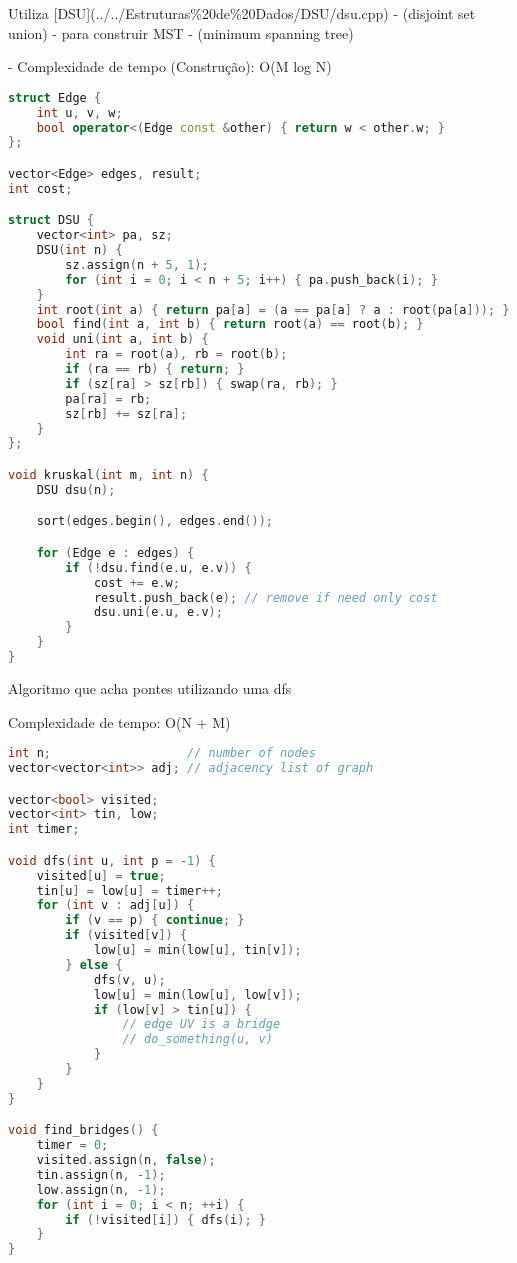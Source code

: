 \documentclass[11pt, a4paper, twoside]{article}
\begin{document}
Utiliza [DSU](../../Estruturas\%20de\%20Dados/DSU/dsu.cpp) - (disjoint set union) - para construir MST - (minimum spanning tree)

- Complexidade de tempo (Construção): O(M log N)

\begin{lstlisting}[language=C++]
struct Edge {
    int u, v, w;
    bool operator<(Edge const &other) { return w < other.w; }
};

vector<Edge> edges, result;
int cost;

struct DSU {
    vector<int> pa, sz;
    DSU(int n) {
        sz.assign(n + 5, 1);
        for (int i = 0; i < n + 5; i++) { pa.push_back(i); }
    }
    int root(int a) { return pa[a] = (a == pa[a] ? a : root(pa[a])); }
    bool find(int a, int b) { return root(a) == root(b); }
    void uni(int a, int b) {
        int ra = root(a), rb = root(b);
        if (ra == rb) { return; }
        if (sz[ra] > sz[rb]) { swap(ra, rb); }
        pa[ra] = rb;
        sz[rb] += sz[ra];
    }
};

void kruskal(int m, int n) {
    DSU dsu(n);

    sort(edges.begin(), edges.end());

    for (Edge e : edges) {
        if (!dsu.find(e.u, e.v)) {
            cost += e.w;
            result.push_back(e); // remove if need only cost
            dsu.uni(e.u, e.v);
        }
    }
}
\end{lstlisting}

Algoritmo que acha pontes utilizando uma dfs

Complexidade de tempo: O(N + M)

\begin{multicols}{2}
\begin{lstlisting}[language=C++]
int n;                   // number of nodes
vector<vector<int>> adj; // adjacency list of graph

vector<bool> visited;
vector<int> tin, low;
int timer;

void dfs(int u, int p = -1) {
    visited[u] = true;
    tin[u] = low[u] = timer++;
    for (int v : adj[u]) {
        if (v == p) { continue; }
        if (visited[v]) {
            low[u] = min(low[u], tin[v]);
        } else {
            dfs(v, u);
            low[u] = min(low[u], low[v]);
            if (low[v] > tin[u]) {
                // edge UV is a bridge
                // do_something(u, v)
            }
        }
    }
}

void find_bridges() {
    timer = 0;
    visited.assign(n, false);
    tin.assign(n, -1);
    low.assign(n, -1);
    for (int i = 0; i < n; ++i) {
        if (!visited[i]) { dfs(i); }
    }
}
\end{lstlisting}
\end{multicols}
\end{document}
